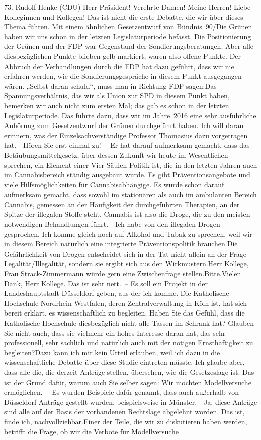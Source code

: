 \documentclass{article}
\begin{document}
	73. Rudolf Henke (CDU) Herr Präsident! Verehrte Damen! Meine Herren! Liebe Kolleginnen und Kollegen! Das ist nicht die erste Debatte, die wir über dieses Thema führen. Mit einem ähnlichen Gesetzentwurf von Bündnis 90/Die Grünen haben wir uns schon in der letzten Legislaturperiode befasst. Die Positionierung der Grünen und der FDP war Gegenstand der Sondierungsberatungen. Aber alle diesbezüglichen Punkte blieben gelb markiert, waren also offene Punkte. Der Abbruch der Verhandlungen durch die FDP hat dazu geführt, dass wir nie erfahren werden, wie die Sondierungsgespräche in diesem Punkt ausgegangen wären. „Selbst daran schuld“, muss man in Richtung FDP sagen.Das Spannungsverhältnis, das wir als Union zur SPD in diesem Punkt haben, bemerken wir auch nicht zum ersten Mal; das gab es schon in der letzten Legislaturperiode. Das führte dazu, dass wir im Jahre 2016 eine sehr ausführliche Anhörung zum Gesetzentwurf der Grünen durchgeführt haben. Ich will daran erinnern, was der Einzelsachverständige Professor Thomasius dazu vorgetragen hat.– Hören Sie erst einmal zu! – Er hat darauf aufmerksam gemacht, dass das Betäubungsmittelgesetz, über dessen Zukunft wir heute im Wesentlichen sprechen, ein Element einer Vier-Säulen-Politik ist, die in den letzten Jahren auch im Cannabisbereich ständig ausgebaut wurde. Es gibt Präventionsangebote und viele Hilfsmöglichkeiten für Cannabisabhängige. Es wurde schon darauf aufmerksam gemacht, dass sowohl im stationären als auch im ambulanten Bereich Cannabis, gemessen an der Häufigkeit der durchgeführten Therapien, an der Spitze der illegalen Stoffe steht. Cannabis ist also die Droge, die zu den meisten notwendigen Behandlungen führt.– Ich habe von den illegalen Drogen gesprochen. Ich komme gleich noch auf Alkohol und Tabak zu sprechen, weil wir in diesem Bereich natürlich eine integrierte Präventionspolitik brauchen.Die Gefährlichkeit von Drogen entscheidet sich in der Tat nicht allein an der Frage Legalität/Illegalität, sondern sie ergibt sich aus den Wirkmustern.Herr Kollege, Frau Strack-Zimmermann würde gern eine Zwischenfrage stellen.Bitte.Vielen Dank, Herr Kollege. Das ist sehr nett. – Es soll ein Projekt in der Landeshauptstadt Düsseldorf geben, aus der ich komme. Die Katholische Hochschule Nordrhein-Westfalen, deren Zentralverwaltung in Köln ist, hat sich bereit erklärt, es wissenschaftlich zu begleiten. Haben Sie das Gefühl, dass die Katholische Hochschule diesbezüglich nicht alle Tassen im Schrank hat? Glauben Sie nicht auch, dass sie vielmehr ein hohes Interesse daran hat, das sehr professionell, sehr sachlich und natürlich auch mit der nötigen Ernsthaftigkeit zu begleiten?Dazu kann ich mir kein Urteil erlauben, weil ich dazu in die wissenschaftliche Debatte über diese Studie eintreten müsste. Ich glaube aber, dass alle die, die derzeit Anträge stellen, übersehen, wie die Gesetzeslage ist. Das ist der Grund dafür, warum auch Sie selber sagen: Wir möchten Modellversuche ermöglichen. – Es wurden Beispiele dafür genannt, dass auch außerhalb von Düsseldorf Anträge gestellt wurden, beispielsweise in Münster.– Ja, diese Anträge sind alle auf der Basis der vorhandenen Rechtslage abgelehnt worden. Das ist, finde ich, nachvollziehbar.Einer der Teile, die wir zu diskutieren haben werden, betrifft die Frage, ob wir die Verbote für Modellversuche 
\end{document}

